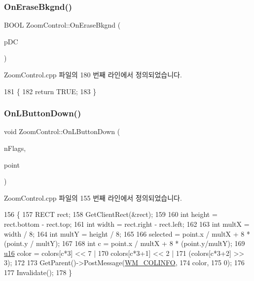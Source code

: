 \subsubsection{\texorpdfstring{On\+Erase\+Bkgnd()}{OnEraseBkgnd()}}
{\footnotesize\ttfamily B\+O\+OL Zoom\+Control\+::\+On\+Erase\+Bkgnd (\begin{DoxyParamCaption}\item[{C\+DC $\ast$}]{p\+DC }\end{DoxyParamCaption})\hspace{0.3cm}{\ttfamily [protected]}}



Zoom\+Control.\+cpp 파일의 180 번째 라인에서 정의되었습니다.


\begin{DoxyCode}
181 \{
182   \textcolor{keywordflow}{return} TRUE;
183 \}
\end{DoxyCode}
\mbox{\label{class_zoom_control_a350939fc193e3fd5dbc1f3e6cb18b4c0}} 
\subsubsection{\texorpdfstring{On\+L\+Button\+Down()}{OnLButtonDown()}}
{\footnotesize\ttfamily void Zoom\+Control\+::\+On\+L\+Button\+Down (\begin{DoxyParamCaption}\item[{U\+I\+NT}]{n\+Flags,  }\item[{C\+Point}]{point }\end{DoxyParamCaption})\hspace{0.3cm}{\ttfamily [protected]}}



Zoom\+Control.\+cpp 파일의 155 번째 라인에서 정의되었습니다.


\begin{DoxyCode}
156 \{
157   RECT rect;
158   GetClientRect(&rect);
159   
160   \textcolor{keywordtype}{int} height = rect.bottom - rect.top;
161   \textcolor{keywordtype}{int} width = rect.right - rect.left;
162 
163   \textcolor{keywordtype}{int} multX = width / 8;
164   \textcolor{keywordtype}{int} multY = height / 8;
165 
166   selected = point.x / multX + 8 * (point.y / multY);
167   
168   \textcolor{keywordtype}{int} c = point.x / multX + 8 * (point.y/multY);
169   \mbox{\hyperlink{_system_8h_a9e6c91d77e24643b888dbd1a1a590054}{u16}} color = colors[c*3] << 7 |
170     colors[c*3+1] << 2 |
171     (colors[c*3+2] >> 3);
172   
173   GetParent()->PostMessage(\mbox{\hyperlink{_zoom_control_8h_a53dcd4fc07901900262e8aa4fc1affd4}{WM\_COLINFO}},
174                            color,
175                            0);
176 
177   Invalidate();
178 \}
\end{DoxyCode}
\mbox{\label{class_zoom_control_a76dc63877ee99097aa9b0aa86a408419}} 
